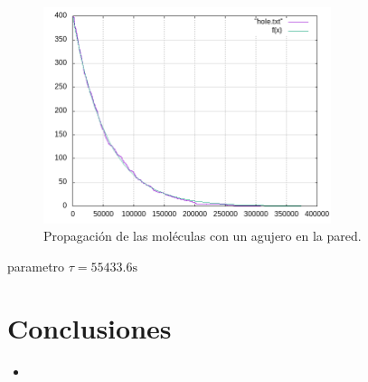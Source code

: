\documentclass[12pt,twocolumn]{article}
\begin{document}
\begin{figure}
    \centering
    \includegraphics[width=0.75\textwidth]{figs/hole.png}
    \caption{Propagación de las moléculas con un agujero en la pared.}
    \label{fig:hole}
\end{figure}

parametro $\tau = 55433.6\mathrm{s}$ 

\section{Conclusiones}
\begin{itemize}
    \item 
\end{itemize}
\end{document}
